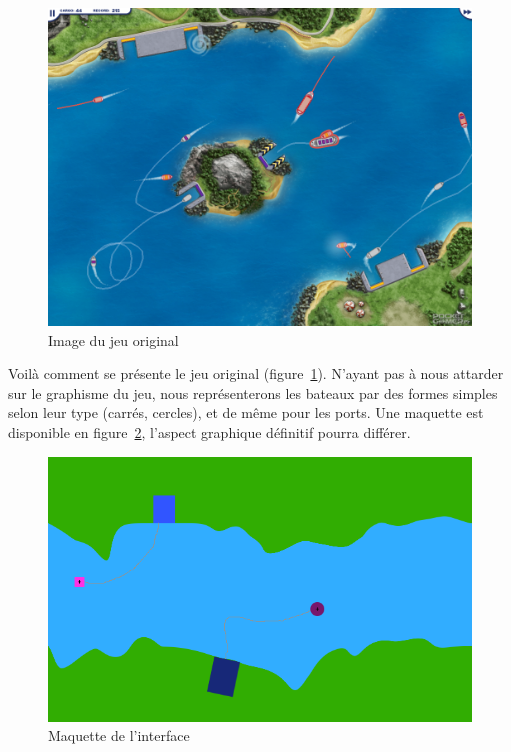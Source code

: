 \begin{figure}[htbp]
  \centering
  \includegraphics[width=\textwidth]{./images/harborMasterOriginal.png}
  \caption{Image du jeu original}
  \label{fig:harborMasterOriginal}
\end{figure}

Voilà comment se présente le jeu original (figure~\ref{fig:harborMasterOriginal}). N'ayant pas à nous attarder sur le graphisme du jeu, nous représenterons les bateaux par des formes simples selon leur type (carrés, cercles), et de même pour les ports. Une maquette est disponible en figure~\ref{fig:maquette}, l'aspect graphique définitif pourra différer. 


\begin{figure}[h]
	\begin{center}
		\includegraphics[width=\textwidth]{images/maquette}
	\end{center}
	\caption{Maquette de l'interface}
	\label{fig:maquette}
\end{figure}
